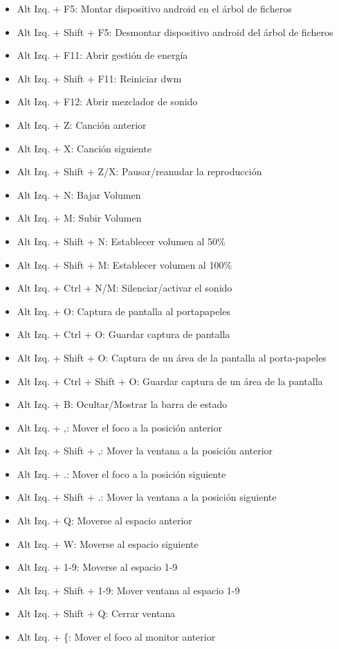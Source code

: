 \documentclass[12pt]{article}
\begin{document}
\begin{itemize}
\item Alt Izq. + F5: Montar dispositivo android en el árbol de ficheros
\item Alt Izq. + Shift + F5: Desmontar dispositivo android del árbol de ficheros
\item Alt Izq. + F11: Abrir gestión de energía
\item Alt Izq. + Shift + F11: Reiniciar dwm
\item Alt Izq. + F12: Abrir mezclador de sonido
\item Alt Izq. + Z: Canción anterior
\item Alt Izq. + X: Canción siguiente
\item Alt Izq. + Shift + Z/X: Pausar/reanudar la reproducción
\item Alt Izq. + N: Bajar Volumen
\item Alt Izq. + M: Subir Volumen
\item Alt Izq. + Shift + N: Establecer volumen al 50\%
\item Alt Izq. + Shift + M: Establecer volumen al 100\%
\item Alt Izq. + Ctrl + N/M: Silenciar/activar el sonido
\item Alt Izq. + O: Captura de pantalla al portapapeles
\item Alt Izq. + Ctrl + O: Guardar captura de pantalla
\item Alt Izq. + Shift + O: Captura de un área de la pantalla al porta-papeles
\item Alt Izq. + Ctrl + Shift + O: Guardar captura de un área de la pantalla
\item Alt Izq. + B: Ocultar/Mostrar la barra de estado
\item Alt Izq. + ,: Mover el foco a la posición anterior
\item Alt Izq. + Shift + ,: Mover la ventana a la posición anterior
\item Alt Izq. + .: Mover el foco a la posición siguiente
\item Alt Izq. + Shift + .: Mover la ventana a la posición siguiente
\item Alt Izq. + Q: Moverse al espacio anterior
\item Alt Izq. + W: Moverse al espacio siguiente
\item Alt Izq. + 1-9: Moverse al espacio 1-9
\item Alt Izq. + Shift + 1-9: Mover ventana al espacio 1-9
\item Alt Izq. + Shift + Q: Cerrar ventana
\item Alt Izq. + \{: Mover el foco al monitor anterior

\end{itemize}
\end{document}
